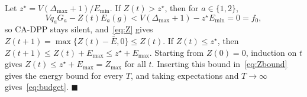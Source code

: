 \documentclass[5p,twocolumn]{elsarticle}
\theoremstyle{remark}
\begin{document}
Let $z^\star=V(\Delta_{\max}+1)/E_{\min}$. If $Z(t)>z^\star$, then for $a\in\{1,2\}$,
\[
Vq_aG_a-Z(t)E_a(g)<V(\Delta_{\max}+1)-z^\star E_{\min}=0=f_0,
\]
so CA-DPP stays silent, and~\eqref{eq:Z} gives $Z(t+1)=\max\{Z(t)-\bar E,0\}\le Z(t)$. If $Z(t)\le z^\star$, then $Z(t+1)\le Z(t)+E_{\max}\le z^\star+E_{\max}$. Starting from $Z(0)=0$, induction on $t$ gives $Z(t)\le z^\star+E_{\max}=Z_{\max}$ for all $t$. Inserting this bound in~\eqref{eq:Zbound} gives the energy bound for every $T$, and taking expectations and $T\to\infty$ gives~\eqref{eq:budget}. \hfill$\blacksquare$

\setlength{\bibsep}{0pt}


\end{document}
